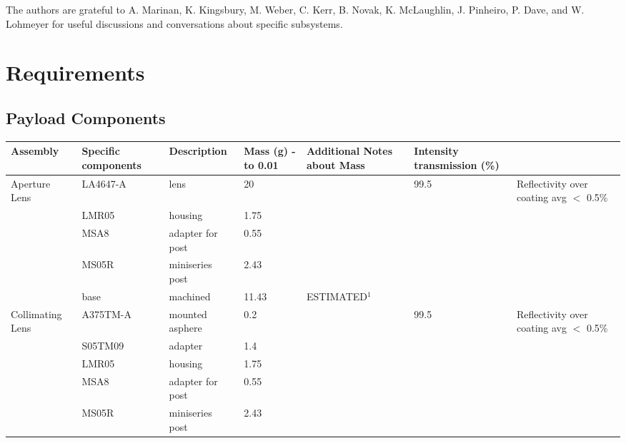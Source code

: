 \documentclass[12pt]{article}
\begin{document}
The authors are grateful to A. Marinan, K. Kingsbury, M. Weber, C. Kerr, B. Novak, K. McLaughlin, J. Pinheiro, P. Dave, and W. Lohmeyer for useful discussions and conversations about specific subsystems.	
	
\FloatBarrier
\newpage
\appendix
\section{Requirements} \label{app:requirements}



\newpage

\begin{landscape}
\section{Payload Components} \label{app:payload_components}
\small
\begin{center}
\begin{longtable}{| p{3.25cm} | p{2.2cm} | p{3cm} | p{1.75cm} | p{2.5cm} | p{1.55cm} | p{5cm} |}
\hline
    \textbf{Assembly} & \textbf{Specific components} & \textbf{Description} & \textbf{Mass (g) - to 0.01} & \textbf{Additional Notes about Mass} & \textbf{Intensity transmission (\%)} &  \\ \hline 
    \midrule 
    \multirow{5}{*}{\parbox{3.25cm}{Aperture Lens}} & LA4647-A & lens  & 20    &       & 99.5  & Reflectivity over coating avg $<$ 0.5\% \\ 
          & LMR05 & housing & 1.75  &       &       &  \\
          & MSA8  & adapter for post & 0.55  &       &       &  \\
          & MS05R & miniseries post & 2.43  &       &       &  \\
          & base  & machined & 11.43 & ESTIMATED$^1$ &       &  \\ \hline
    \multirow{6}{*}{\parbox{3.25cm}{Collimating Lens}} & A375TM-A & mounted asphere & 0.2   &       & 99.5  & Reflectivity over coating avg $<$ 0.5\% \\ 
          & S05TM09 & adapter & 1.4   &       &       &  \\
          & LMR05 & housing & 1.75  &       &       &  \\
          & MSA8  & adapter for post & 0.55  &       &       &  \\
          & MS05R & miniseries post & 2.43  &       &       &  \\

\end{longtable}
\end{center}
\end{landscape}
\end{document}
